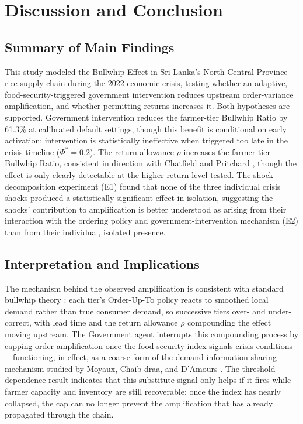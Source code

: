 \documentclass[final,onefignum,onetabnum]{siuro250211}
\begin{document}
\section{Discussion and Conclusion}
\label{sec:discussion}

\subsection{Summary of Main Findings}

This study modeled the Bullwhip Effect in Sri Lanka's North Central Province rice supply chain
during the 2022 economic crisis, testing whether an adaptive, food-security-triggered government
intervention reduces upstream order-variance amplification, and whether permitting returns
increases it. Both hypotheses are supported. Government intervention reduces the farmer-tier
Bullwhip Ratio by 61.3\% at calibrated default settings, though this benefit is conditional on
early activation: intervention is statistically ineffective when triggered too late in the crisis
timeline ($\Phi^{*}=0.2$). The return allowance $\rho$ increases the farmer-tier Bullwhip Ratio,
consistent in direction with Chatfield and Pritchard \cite{ChatfieldPritchard2013}, though the
effect is only clearly detectable at the higher return level tested. The shock-decomposition
experiment (E1) found that none of the three individual crisis shocks produced a statistically
significant effect in isolation, suggesting the shocks' contribution to amplification is better
understood as arising from their interaction with the ordering policy and government-intervention
mechanism (E2) than from their individual, isolated presence.

\subsection{Interpretation and Implications}

The mechanism behind the observed amplification is consistent with standard bullwhip theory
\cite{LeePadmanabhanWhang1997}: each tier's Order-Up-To policy reacts to smoothed local demand
rather than true consumer demand, so successive tiers over- and under-correct, with lead time and
the return allowance $\rho$ compounding the effect moving upstream. The Government agent
interrupts this compounding process by capping order amplification once the food security index
signals crisis conditions---functioning, in effect, as a coarse form of the demand-information
sharing mechanism studied by Moyaux, Chaib-draa, and D'Amours \cite{MoyauxChaibdraaDamours2007}.
The threshold-dependence result indicates that this substitute signal only helps if it fires while
farmer capacity and inventory are still recoverable; once the index has nearly collapsed, the cap
can no longer prevent the amplification that has already propagated through the chain.
\end{document}

